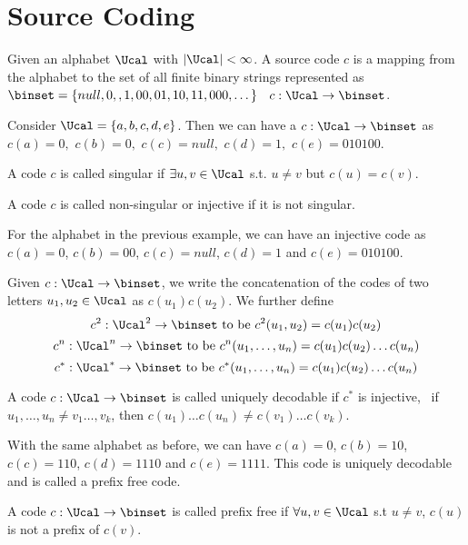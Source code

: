 \section{Source Coding}
\begin{definition}
Given an alphabet $\Ucal$ with $|\Ucal| < \infty$. A source code $c$ is a mapping from the alphabet to the set of all finite binary strings represented as $\binset = \{null, 0, ,1, 00, 01, 10, 11, 000, \dots\}$ \ie\ $c:\Ucal \to \binset$.
\end{definition}
\begin{eg}
Consider $\Ucal = \{a,b,c,d,e\}$. Then we can have a $c:\Ucal \to \binset$ as
$c(a) = 0,$ $c(b) = 0,$ $c(c) = null,$ $c(d) = 1,$ $c(e) = 010100$.
\end{eg}
\begin{definition}
A code $c$ is called singular if $\exists u, v \in \Ucal$ s.t. $u\neq v$ but $c(u) = c(v)$.
\end{definition}
\begin{definition}
A code $c$ is called non-singular or injective if it is not singular.
\end{definition}
\begin{eg}
For the alphabet in the previous example, we can have an injective code as $c(a) = 0$, $c(b) = 00$, $c(c) = null$, $c(d) = 1$ and $c(e) = 010100$.
\end{eg}
\begin{definition}
Given $c: \Ucal \to \binset$, we write the concatenation of the codes of two letters $u_1, u_2 \in \Ucal$ as $c(u_1)c(u_2)$. We further define
\[c^2: \Ucal^2 \to \binset \text{ to be } c^2(u_1, u_2) = c(u_1)c(u_2)\]
\[c^n: \Ucal^n \to \binset \text{ to be } c^n(u_1, \dots, u_n) = c(u_1)c(u_2)\dots c(u_n)\]
\[c^*: \Ucal^* \to\binset \text{ to be } c^*(u_1,\dots,u_n) = c(u_1)c(u_2)\dots c(u_n)\]
\end{definition}
\begin{definition}
A code $c:\Ucal\to\binset$ is called uniquely decodable if $c^*$ is injective, \ie\ if $u_1,\dots,u_n \neq v_1\dots,v_k$, then $c(u_1)\dots c(u_n) \neq c(v_1)\dots c(v_k)$.
\end{definition}
\begin{eg}
With the same alphabet as before, we can have $c(a) = 0$, $c(b) = 10$, $c(c) = 110$, $c(d) = 1110$ and $c(e) = 1111$. This code is uniquely decodable and is called a prefix free code.
\end{eg}
\begin{definition}
A code $c:\Ucal\to\binset$ is called prefix free if $\forall u,v \in \Ucal$ s.t $u\neq v$, $c(u)$ is not a prefix of $c(v)$.
\end{definition}
